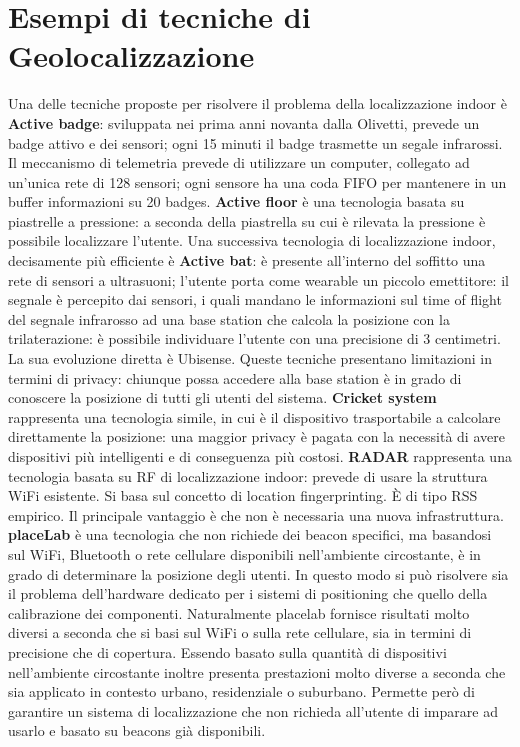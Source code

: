 \section{Esempi di tecniche di Geolocalizzazione}
Una delle tecniche proposte per risolvere il problema della localizzazione
indoor è \textbf{Active badge}: sviluppata nei prima anni novanta dalla
Olivetti, prevede un badge attivo e dei sensori; ogni 15 minuti il badge
trasmette un segale infrarossi. Il meccanismo di telemetria prevede di utilizzare
un computer, collegato ad un'unica rete di 128 sensori; ogni sensore ha una coda
FIFO per mantenere in un buffer informazioni su 20 badges.
\bigbreak
\textbf{Active floor} è una tecnologia basata su piastrelle a pressione: a
seconda della piastrella su cui è rilevata la pressione è possibile localizzare
l'utente.
\bigbreak
Una successiva tecnologia di localizzazione indoor, decisamente più efficiente è
\textbf{Active bat}: è presente all'interno del soffitto una rete di sensori a
ultrasuoni; l'utente porta come wearable un piccolo emettitore: il segnale è
percepito dai sensori, i quali mandano le informazioni sul time of flight del
segnale infrarosso ad una base station che calcola la posizione con la
trilaterazione: è possibile individuare l'utente con una precisione di 3
centimetri.
La sua evoluzione diretta è Ubisense.
\bigbreak
Queste tecniche presentano limitazioni in termini di privacy: chiunque possa
accedere alla base station è in grado di conoscere la posizione di tutti gli
utenti del sistema. \textbf{Cricket system} rappresenta una tecnologia simile,
in cui è il dispositivo trasportabile a calcolare direttamente la posizione: una
maggior privacy è pagata con la necessità di avere dispositivi più intelligenti
e di conseguenza più costosi.
\bigbreak
\textbf{RADAR} rappresenta una tecnologia basata su RF di localizzazione indoor:
prevede di usare la struttura WiFi esistente. Si basa sul concetto di location
fingerprinting. È di tipo RSS empirico. Il principale vantaggio è che non è
necessaria una nuova infrastruttura.
\bigbreak
\textbf{placeLab} è una tecnologia che non richiede dei beacon specifici, ma
basandosi sul WiFi, Bluetooth o rete cellulare disponibili nell'ambiente
circostante, è in grado di determinare la posizione degli utenti. In questo modo
si può risolvere sia il problema dell'hardware dedicato per i sistemi di
positioning che quello della calibrazione dei componenti.
Naturalmente placelab fornisce risultati molto diversi a seconda che si basi sul
WiFi o sulla rete cellulare, sia in termini di precisione che di copertura.
Essendo basato sulla quantità di dispositivi nell'ambiente circostante inoltre
presenta prestazioni molto diverse a seconda che sia applicato in contesto
urbano, residenziale o suburbano.
Permette però di garantire un sistema di localizzazione che non richieda
all'utente di imparare ad usarlo e basato su beacons già disponibili.

